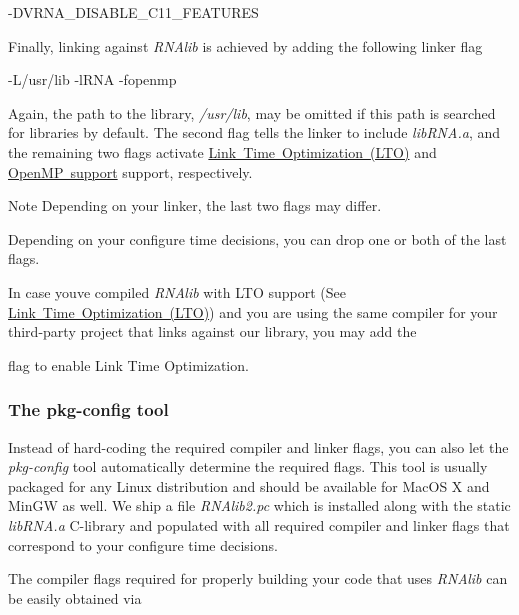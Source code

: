 \begin{DoxyVerb}-DVRNA_DISABLE_C11_FEATURES
\end{DoxyVerb}


Finally, linking against {\itshape R\+N\+Alib} is achieved by adding the following linker flag

\begin{DoxyVerb}-L/usr/lib -lRNA -fopenmp
\end{DoxyVerb}


Again, the path to the library, {\itshape /usr/lib}, may be omitted if this path is searched for libraries by default. The second flag tells the linker to include {\itshape lib\+R\+N\+A.\+a}, and the remaining two flags activate \mbox{\hyperlink{install_config_lto}{Link Time Optimization (L\+TO)}} and \mbox{\hyperlink{install_config_openmp}{Open\+MP support}} support, respectively. \begin{DoxyNote}{Note}
Depending on your linker, the last two flags may differ. 

Depending on your configure time decisions, you can drop one or both of the last flags. 

In case you\textquotesingle{}ve compiled {\itshape R\+N\+Alib} with L\+TO support (See \mbox{\hyperlink{install_config_lto}{Link Time Optimization (L\+TO)}}) and you are using the same compiler for your third-\/party project that links against our library, you may add the
\begin{DoxyCode}{0}
\end{DoxyCode}
 flag to enable Link Time Optimization.
\end{DoxyNote}
\hypertarget{install_linking_pkgconfig}{}\subsubsection{The pkg-\/config tool}\label{install_linking_pkgconfig}
Instead of hard-\/coding the required compiler and linker flags, you can also let the {\itshape pkg-\/config} tool automatically determine the required flags. This tool is usually packaged for any Linux distribution and should be available for Mac\+OS X and Min\+GW as well. We ship a file {\itshape R\+N\+Alib2.\+pc} which is installed along with the static {\itshape lib\+R\+N\+A.\+a} C-\/library and populated with all required compiler and linker flags that correspond to your configure time decisions.

The compiler flags required for properly building your code that uses {\itshape R\+N\+Alib} can be easily obtained via

